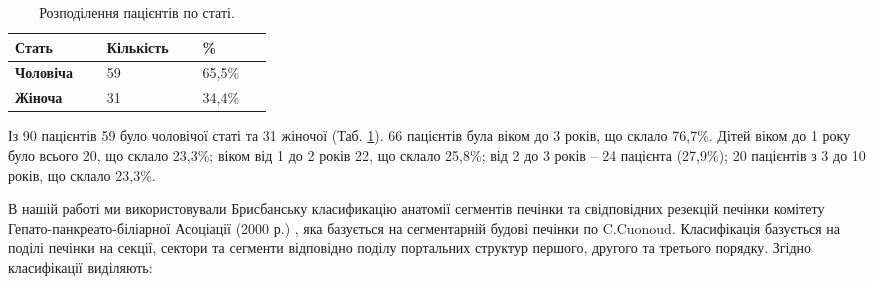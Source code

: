 \begin{table}[]
\centering
\caption{Розподілення пацієнтів по статі.}
\label{tab:sex}
\begin{tabular}{|p{0.1\linewidth}|p{0.1\linewidth}|p{0.1\linewidth}|}
\hline
\textbf{Стать}    & {\color[HTML]{231F20} \textbf{Кількість}} & {\color[HTML]{231F20} \textbf{\%}} \\ \hline
\textbf{Чоловіча} & 59                                        & 65,5\%                            \\ \hline
\textbf{Жіноча}   & 31                                        & 34,4\%                            \\ \hline
\end{tabular}
\end{table}

Із 90 пацієнтів 59 було чоловічої статі та 31 жіночої (Таб. \ref{tab:sex}). 66 пацієнтів була віком до 3 років, що склало 76,7\%. Дітей віком до 1 року було всього 20, що склало 23,3\%; віком від 1 до 2 років 22, що склало 25,8\%; від 2 до 3 років – 24 пацієнта (27,9\%); 20 пацієнтів з 3 до 10 років, що склало 23,3\%.

В нашій работі ми використовували Брисбанську класификацію анатомії сегментів печінки та свідповідних резекцій печінки комітету Гепато-панкреато-біліарної Асоціації (2000 р.) \cite{pmid24852330}, яка базується на сегментарній будові печінки по C.Cuonoud. Класифікація базується на поділі печінки на секції, сектори та сегменти відповідно поділу портальних структур першого, другого та третього порядку. Згідно класифікації виділяють: 

